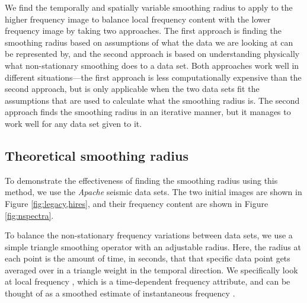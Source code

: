         We find the temporally and spatially variable smoothing radius to apply to the higher frequency image to balance local frequency content with the lower frequency image by taking two approaches.
        The first approach is finding the smoothing radius based on assumptions of what the data we are looking at can be represented by, and the second approach is based on understanding physically what non-stationary smoothing does to a data set.
        Both approaches work well in different situations---the first approach is less computationally expensive than the second approach, but is only applicable when the two data sets fit the assumptions that are used to calculate what the smoothing radius is.
        The second approach finds the smoothing radius in an iterative manner, but it manages to work well for any data set given to it.


        \subsection{Theoretical smoothing radius}
        To demonstrate the effectiveness of finding the smoothing radius using this method, we use the {\it Apache} seismic data sets.
        The two initial images are shown in Figure \ref{fig:legacy,hires}, and their frequency content are shown in Figure \ref{fig:nspectra}.

        To balance the non-stationary frequency variations between data sets, we use a simple triangle smoothing operator with an adjustable radius. 
        Here, the radius at each point is the amount of time, in seconds, that that specific data point gets averaged over in a triangle weight in the temporal direction.
        We specifically look at local frequency \cite[]{attr}, which is a time-dependent frequency attribute, and can be thought of as a smoothed estimate of instantaneous frequency \cite[]{white}. 

